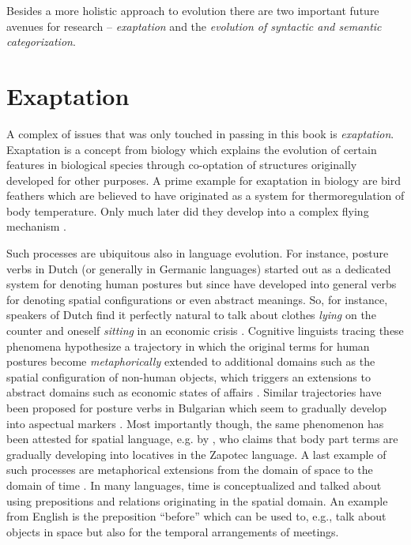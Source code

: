 Besides a more holistic approach to evolution there are two 
important future avenues for research -- \emph{exaptation} and the
\emph{evolution of syntactic and semantic categorization}.

\section{Exaptation}
A complex of issues that was only touched in passing in this book
is \emph{exaptation}. Exaptation is a concept from biology 
\citep{gould1979spandrels,gould1982exaptation,gould1991exaptation} 
which explains the evolution
of certain features in biological species through co-optation of 
structures originally developed for other purposes. A prime example
for exaptation in biology are bird feathers which are believed to have originated
as a system for thermoregulation of body temperature. Only much later
did they develop into a complex flying mechanism \citep{ostrom1974archaeopteryx,zhou2004origins}. 

Such processes are ubiquitous also in language evolution. For instance,
posture verbs in Dutch (or generally in Germanic languages) started out 
as a dedicated system for denoting human postures but since have 
developed into general verbs for denoting spatial configurations or even abstract 
meanings. So, for instance, speakers of Dutch find it perfectly natural to talk 
about clothes \emph{lying} on the counter and oneself \emph{sitting} in an 
economic crisis 
\citep{lemmens2002semantic,lemmens2004metaphor,spranger2009semantics,steels2009space}. Cognitive linguists tracing these 
phenomena hypothesize a trajectory in which the original terms 
for human postures become \emph{metaphorically} 
extended to additional domains such as the spatial configuration of 
non-human objects, which triggers an extensions to abstract 
domains such as economic states of affairs \citep{lemmens2004metaphor}. 
Similar trajectories have been proposed for posture verbs in Bulgarian 
which seem to gradually develop into aspectual markers \citep{kuteva1999sit}.
Most importantly though, the same phenomenon has been attested for 
spatial language, e.g. by \cite{maclaury1989zapotec}, who claims that 
body part terms are gradually developing
into locatives in the Zapotec language. A last example of such processes
are metaphorical extensions from the domain of space to the domain of time 
\citep{boroditsky2000metaphoric,tenbrink2011reference}. In many languages, 
time is conceptualized and talked about using prepositions and relations originating in the spatial domain. An example from English is the preposition ``before'' 
which can be used to, e.g., talk about 
objects in space but also for the temporal arrangements of meetings.

